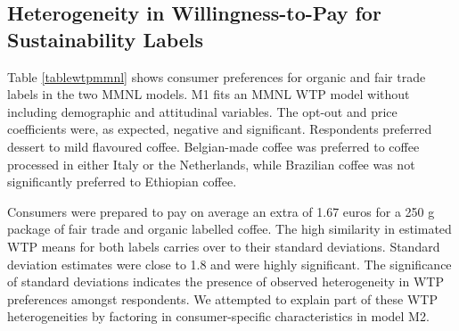 \documentclass[sustainability,article,accept,moreauthors,pdftex,10pt,a4paper]{Definitions/mdpi}
\theoremstyle{mdpi}
\newcounter{ex}
\newcounter{re}
\theoremstyle{mdpidefinition}
\begin{document}
{\subsection{Heterogeneity in Willingness-to-Pay for Sustainability Labels}\label{wtpmmnl}
\par{Table \ref{tablewtpmmnl} shows consumer preferences for organic and fair trade labels in the two MMNL models. M1 fits an MMNL WTP model without including demographic and attitudinal variables. The opt-out and price coefficients were, as expected, negative and significant. Respondents preferred dessert to mild flavoured coffee. Belgian-made coffee was preferred to coffee processed in either Italy or the Netherlands, while Brazilian coffee was not significantly preferred to Ethiopian coffee.}
\par{Consumers were prepared to pay on average an extra of 1.67 euros for a 250 g package of fair trade and organic labelled coffee. The high similarity in estimated WTP means for both labels carries over to their standard deviations. Standard deviation estimates were close to 1.8 and were highly significant. The significance of standard deviations indicates the presence of observed heterogeneity in WTP preferences amongst respondents. We attempted to explain part of these WTP heterogeneities by factoring in consumer-specific characteristics in model M2.

}}
\end{document}

